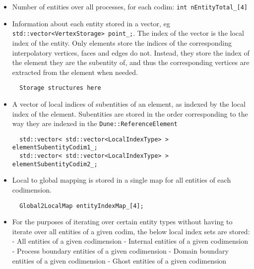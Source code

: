 \begin{itemize}
	\item Number of entities over all processes, for each codim:  \lstinline|int nEntityTotal_[4]|
	\item Information about each entity stored in a vector, eg  \lstinline|std::vector<VertexStorage> point_;|. The index of the vector is the local index of the entity. Only elements store the indices of the corresponding interpolatory vertices, faces and edges do not. Instead, they store the index of the element they are the subentity of, and thus the corresponding vertices are extracted from the element when needed.

\begin{mybox}
\begin{lstlisting}
  Storage structures here
\end{lstlisting}
\end{mybox}	
	
	\item A vector of local indices of subentities of an element, as indexed by the local index of the element. Subentities are stored in the order corresponding to the way they are indexed in the \lstinline|Dune::ReferenceElement|
	
\begin{mybox}
\begin{lstlisting}
  std::vector< std::vector<LocalIndexType> > elementSubentityCodim1_;
  std::vector< std::vector<LocalIndexType> > elementSubentityCodim2_;	
\end{lstlisting}
\end{mybox}

	\item Local to global mapping is stored in a single map for all entities of each codimension.
	
\begin{mybox}
\begin{lstlisting}
  Global2LocalMap entityIndexMap_[4];
\end{lstlisting}
\end{mybox}

    \item For the purposes of iterating over certain entity types without having to iterate over all entities of a given codim, the below local index sets are stored:
        \subitem - All entities of a given codimension
        \subitem - Internal entities of a given codimension
        \subitem - Process boundary entities of a given codimension
        \subitem - Domain boundary entities of a given codimension
        \subitem - Ghost entities of a given codimension
        

\end{itemize}
